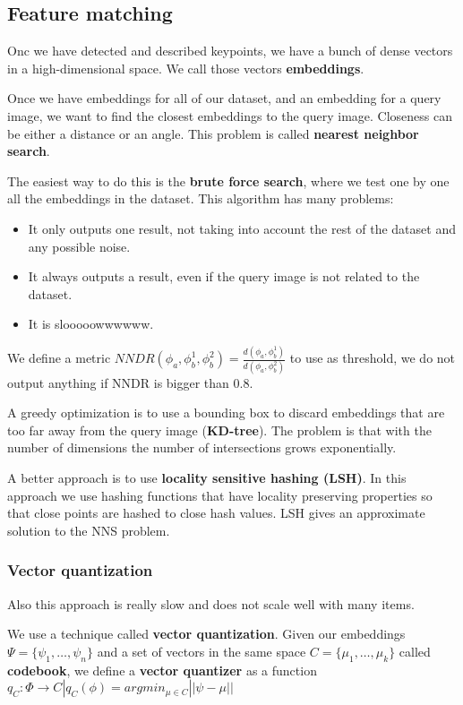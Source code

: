 \subsection{Feature matching}
\label{sec:feature_matching}

Onc we have detected and described keypoints, we have a bunch of dense vectors in a high-dimensional space.
We call those vectors \textbf{embeddings}.

Once we have embeddings for all of our dataset, and an embedding for a query image, we want to find the closest
embeddings to the query image. Closeness can be either a distance or an angle.
This problem is called \textbf{nearest neighbor search}.

The easiest way to do this is the \textbf{brute force search}, where we test one by one all the embeddings in the dataset.
This algorithm has many problems:
\begin{itemize}
    \item It only outputs one result, not taking into account the rest of the dataset and any possible noise.
    \item It always outputs a result, even if the query image is not related to the dataset.
    \item It is slooooowwwwww.
\end{itemize}

We define a metric $NNDR(\phi_a, \phi_b^1, \phi_b^2)=\frac{d(\phi_a, \phi_b^1)}{d(\phi_a, \phi_b^2)}$ to use as threshold,
we do not output anything if NNDR is bigger than 0.8.

A greedy optimization is to use a bounding box to discard embeddings that are too far away from the query image (\textbf{KD-tree}).
The problem is that with the number of dimensions the number of intersections grows exponentially.

A better approach is to use \textbf{locality sensitive hashing (LSH)}.
In this approach we use hashing functions that have locality preserving properties
so that close points are hashed to close hash values.
LSH gives an approximate solution to the NNS problem.

\subsubsection{Vector quantization}

Also this approach is really slow and does not scale well with many items.

We use a technique called \textbf{vector quantization}.
Given our embeddings $\Psi=\{\psi_1, \dots, \psi_n\}$ and a set of vectors in the same 
space $C=\{\mu_1, \dots, \mu_k\}$ called \textbf{codebook},
we define a \textbf{vector quantizer} as a function $q_C:\Phi\rightarrow C | q_C(\phi)=argmin_{\mu\in C}||\psi-\mu||$

